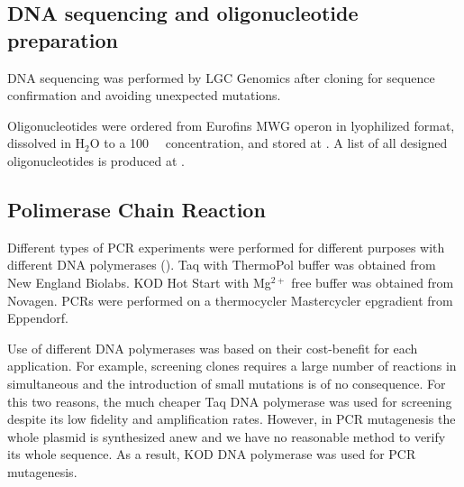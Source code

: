     \subsection{DNA sequencing and oligonucleotide preparation}
      DNA sequencing was performed by LGC Genomics after cloning for sequence
      confirmation and avoiding unexpected mutations.

      Oligonucleotides were ordered from Eurofins MWG operon in lyophilized
      format, dissolved in H$_2$O to a \SI{100}{\micro\Molar} concentration,
      and stored at . A list of all designed oligonucleotides is
      produced at .

    \subsection{Polimerase Chain Reaction}
      Different types of PCR experiments were performed for different purposes
      with different DNA polymerases (). Taq with ThermoPol
      buffer was obtained from New England Biolabs. KOD Hot Start with Mg$^{2+}$
      free buffer was obtained from Novagen. PCRs were performed on a thermocycler
      Mastercycler epgradient from Eppendorf.

      Use of different DNA polymerases was based on their cost-benefit for
      each application. For example, screening clones requires a large number
      of reactions in simultaneous and the introduction of small mutations
      is of no consequence. For this two reasons, the much cheaper Taq DNA
      polymerase was used for screening despite its low fidelity and
      amplification rates. However, in PCR mutagenesis the whole plasmid
      is synthesized anew and we have no reasonable method to verify its whole
      sequence. As a result, KOD DNA polymerase was used for PCR mutagenesis.

